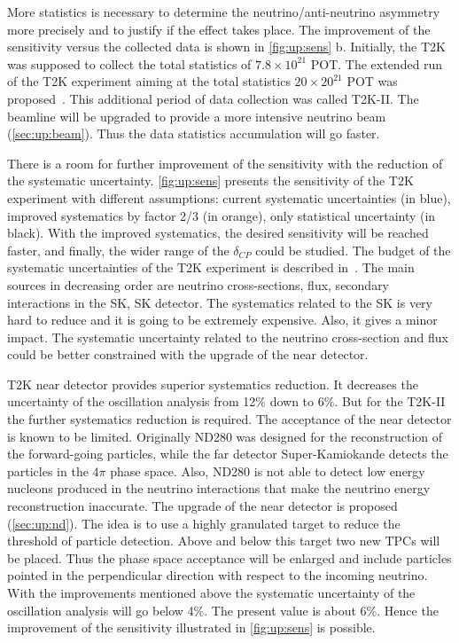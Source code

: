\documentclass[../main.tex]{subfiles}
\begin{document}
More statistics is necessary to determine the neutrino/anti-neutrino asymmetry more precisely and to justify if the effect takes place. The improvement of the sensitivity versus the collected data is shown in \autoref{fig:up:sens} b. Initially, the T2K was supposed to collect the total statistics of $7.8\times10^{21}$ POT. The extended run of the T2K experiment aiming at the total statistics $20\times20^{21}$ POT was proposed~\cite{Abe2016e}. This additional period of data collection was called T2K-II. The beamline will be upgraded to provide a more intensive neutrino beam (\autoref{sec:up:beam}). Thus the data statistics accumulation will go faster. 

There is a room for further improvement of the sensitivity with the reduction of the systematic uncertainty. \autoref{fig:up:sens} presents the sensitivity of the T2K experiment with different assumptions: current systematic uncertainties (in blue), improved systematics by factor 2/3 (in orange), only statistical uncertainty (in black). With the improved systematics, the desired sensitivity will be reached faster, and finally, the wider range of the $\delta_{CP}$ could be studied. The budget of the systematic uncertainties of the T2K experiment is described in~\cite{Abe2017}. The main sources in decreasing order are neutrino cross-sections, flux, secondary interactions in the SK, SK detector. The systematics related to the SK is very hard to reduce and it is going to be extremely expensive. Also, it gives a minor impact. The systematic uncertainty related to the neutrino cross-section and flux could be better constrained with the upgrade of the near detector.

T2K near detector provides superior systematics reduction. It decreases the uncertainty of the oscillation analysis from 12\% down to 6\%. But for the T2K-II the further systematics reduction is required. The acceptance of the near detector is known to be limited. Originally ND280 was designed for the reconstruction of the forward-going particles, while the far detector Super-Kamiokande detects the particles in the $4\pi$ phase space. Also, ND280 is not able to detect low energy nucleons produced in the neutrino interactions that make the neutrino energy reconstruction inaccurate. The upgrade of the near detector is proposed (\autoref{sec:up:nd}). The idea is to use a highly granulated target to reduce the threshold of particle detection. Above and below this target two new TPCs will be placed. Thus the phase space acceptance will be enlarged and include particles pointed in the perpendicular direction with respect to the incoming neutrino. With the improvements mentioned above the systematic uncertainty of the oscillation analysis will go below 4\%. The present value is about 6\%. Hence the improvement of the sensitivity illustrated in \autoref{fig:up:sens} is possible.
\end{document}
